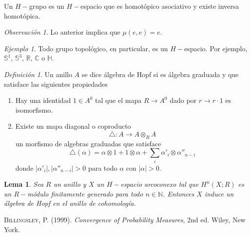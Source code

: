 \documentclass[aop]{imsart2}
\theoremstyle{plain}
\newtheorem{lema}[teo]{Lema}
\theoremstyle{remark}
\newtheorem{dfn}[teo]{Definición}
\newtheorem*{ej}{Ejemplo}
\newtheorem*{obs}{Observación}
\newcommand{\abs}[1]{\left|#1 \right|}
\def \C {\mathbb{C}}
\def \R {\mathbb{R}}
\def \N {\mathbb{N}}
\def \S {\mathbb{S}}
\def \H {\mathbb{H}}
\begin{document}
Un $H-$grupo es un $H-$espacio que es homotópico asociativo y existe inversa homotópica.

\begin{obs}
    Lo anterior implica que $\mu(e,e)=e$.
\end{obs}

\begin{ej}
    Todo grupo topológico, en particular, es un $H-$espacio. Por ejemplo, $\S^{1}$, $\S^{3}$, 
    $\R$, $\C$ o $\H$.
\end{ej}

\begin{dfn}
    Un anillo $A$ se dice álgebra de Hopf si es álgebra graduada y que satisface las siguientes
    propiedades
    \begin{enumerate}
        \item Hay una identidad $1\in A^{0}$ tal que el mapa $R\to A^{0}$ dado por $r\to r\cdot1$
        es isomorfismo.
        
        \item Existe un mapa diagonal o coproducto
        \begin{equation*}
            \triangle:A\to A\otimes_{R}A
        \end{equation*}
        un morfismo de algebras graduadas que satisface
        \begin{equation*}
            \triangle(\alpha)
            =\alpha\otimes1+1\otimes\alpha+\sum_{i}\alpha'_{i}\otimes\alpha''_{n-i}
        \end{equation*}
        donde $\abs{\alpha'_{i}},\abs{\alpha''_{n-i}}>0$ para todo $\alpha$ con $\abs{\alpha}>0$.
    \end{enumerate}
\end{dfn}

\begin{lema}
    Sea $R$ un anillo y $X$ un $H-$espacio arcoconexo tal que $H^{n}(X;R)$ es un $R-$módulo 
    finitamente generado para todo $n\in\N$. Entonces $X$ induce un álgebra de Hopf en el anillo
    de cohomología. 
\end{lema}

\newpage
\begin{thebibliography}{1}
        \textsc{Billingsley, P.} (1999). 
        \textit{Convergence of Probability Measures}, 2nd ed. Wiley, New York.
    \end{thebibliography}
\end{document}
